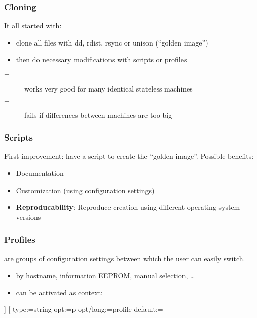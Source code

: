 

\begin{frame}
	\frametitle{Cloning}

	It all started with:

	\begin{itemize}
	\item clone all files with dd, rdist, rsync or unison (``golden image'')
	\item then do necessary modifications with scripts or profiles
	\end{itemize}

	\pause

	\begin{description}
	\item[$+$] works very good for many identical stateless machines
	\item[$-$] fails if differences between machines are too big
	\end{description}
\end{frame}

\begin{frame}
	\frametitle{Scripts}

	First improvement: have a script to create the ``golden image''.
	Possible benefits:

	\begin{itemize}[<+-| alert@+>]
	\item Documentation
	\item Customization (using configuration settings)
	\item \textbf{Reproducability}: Reproduce creation using different operating system versions
	\end{itemize}
\end{frame}

\begin{frame}[fragile]
	\frametitle{Profiles}

	 are groups of configuration settings between which the user can easily switch.

	\begin{itemize}
	\item by hostname, information EEPROM, manual selection, \dots
	\item can be activated as context:
	\end{itemize}

	\begin{code}[morekeywords={long},gobble=4]]
	[%
	  type:=string
	  opt:=p
	  opt/long:=profile
	  default:=
	\end{code}
\end{frame}


